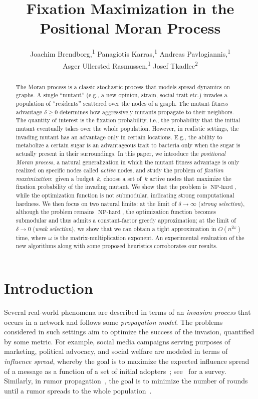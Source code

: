 \documentclass[letterpaper]{article}
\title{Fixation Maximization in the Positional Moran Process}
\author{
Joachim Brendborg,\textsuperscript{\rm 1}
Panagiotis Karras,\textsuperscript{\rm 1}
Andreas Pavlogiannis,\textsuperscript{\rm 1}\\
Asger Ullersted Rasmussen,\textsuperscript{\rm 1}
Josef Tkadlec\textsuperscript{\rm 2}
}
\newcommand{\FitAdv}{\delta}
\newcommand{\NPH}{\operatorname{NP-hard}}
\begin{document}
\maketitle

\begin{abstract}
The Moran process is a classic stochastic process that models spread dynamics on graphs.
A single ``mutant'' (e.g., a new opinion, strain, social trait etc.) invades a population of ``residents'' scattered over the nodes of a graph.
The mutant fitness advantage $\FitAdv\geq 0$ determines how aggressively mutants propagate to their neighbors.
The quantity of interest is the fixation probability, i.e., the probability that the initial mutant eventually takes over the whole population.
However, in realistic settings, the invading mutant has an advantage only in certain locations.
E.g., the ability to metabolize a certain sugar is an advantageous trait to bacteria only when the sugar is actually present in their surroundings.
In this paper, we introduce the \emph{positional Moran process}, a natural generalization in which the mutant fitness advantage is only realized on specific nodes called \emph{active} nodes, and study the problem of \emph{fixation maximization}:~given a budget~$k$, choose a set of~$k$ active nodes that maximize the fixation probability of the invading mutant.
We show that the problem is $\NPH$, while the optimization function is not submodular, indicating strong computational hardness.
We then focus on two natural limits:
at the limit of $\FitAdv\to\infty$ (\emph{strong selection}), although the problem remains $\NPH$, the optimization function becomes submodular and thus admits a constant-factor greedy approximation; at the limit of~$\FitAdv\to 0$ (\emph{weak selection}), we show that we can obtain a tight approximation in
$O(n^{2\omega})$ time, where
$\omega$ is the matrix-multiplication exponent. An experimental evaluation of the new algorithms along with some proposed heuristics corroborates our results.
\end{abstract}


\section{Introduction}

Several real-world phenomena are described in terms of an \emph{invasion process} that occurs in a network and follows some \emph{propagation model}.
The problems considered in such settings aim to optimize the success of the invasion, quantified by some metric.
For example, social media campaigns serving purposes of marketing, political advocacy, and social welfare are modeled in terms of \emph{influence spread}, whereby the goal is to maximize the expected influence spread of a message as a function of a set of initial adopters~\cite{Kempe2003, Youze:2014, Borgs:2014:MSI, Tang:2015:IMN, Zhang2020}; see~\cite{IM-Survey} for a survey.
Similarly, in rumor propagation~\cite{Demers1987}, the goal is to minimize the number of rounds until a rumor
spreads to the whole population~\cite{Fountoulakis2012}.
\end{document}
